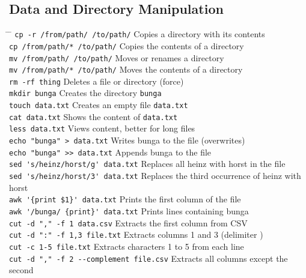 \documentclass[a4paper,10pt]{article}
\begin{document}
\subsection{Data and Directory Manipulation}
\begin{tabbing}
	\= \hspace{60mm} \= \hspace{80mm} \kill
	\> \verb|cp -r /from/path/ /to/path/| \> Copies a directory with its contents \\
	\> \verb|cp /from/path/* /to/path/| \> Copies the contents of a directory \\
	\> \verb|mv /from/path/ /to/path/| \> Moves or renames a directory \\
	\> \verb|mv /from/path/* /to/path/| \> Moves the contents of a directory \\
	\> \verb|rm -rf thing| \> Deletes a file or directory (force) \\
	\> \verb|mkdir bunga| \> Creates the directory \verb|bunga| \\
	\> \verb|touch data.txt| \> Creates an empty file \verb|data.txt| \\
	\> \verb|cat data.txt| \> Shows the content of \verb|data.txt| \\
	\> \verb|less data.txt| \> Views content, better for long files \\
	\> \verb|echo "bunga" > data.txt| \> Writes bunga to the file (overwrites) \\
	\> \verb|echo "bunga" >> data.txt| \> Appends bunga to the file \\
	\> \verb|sed 's/heinz/horst/g' data.txt| \> Replaces all heinz with horst in the file \\
	\> \verb|sed 's/heinz/horst/3' data.txt| \> Replaces the third occurrence of heinz with horst \\
	\> \verb|awk '{print $1}' data.txt| \> Prints the first column of the file \\
	\> \verb|awk '/bunga/ {print}' data.txt| \> Prints lines containing bunga \\
	\> \verb|cut -d "," -f 1 data.csv| \> Extracts the first column from CSV \\
	\> \verb|cut -d ":" -f 1,3 file.txt| \> Extracts columns 1 and 3 (delimiter \:) \\
	\> \verb|cut -c 1-5 file.txt| \> Extracts characters 1 to 5 from each line \\
	\> \verb|cut -d "," -f 2 --complement file.csv| \> Extracts all columns except the second \\
\end{tabbing}
\end{document}
